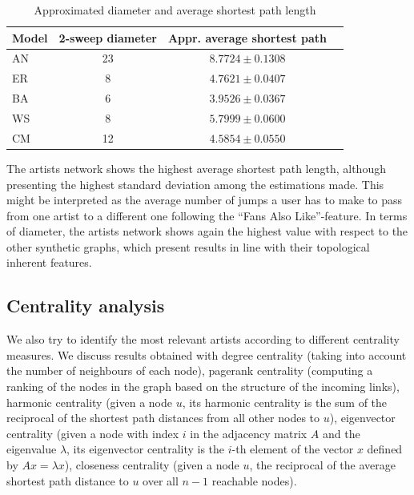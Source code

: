 \documentclass[sigchi]{acmart}
\begin{document}
\renewcommand{\arraystretch}{1.3}
\begin{table}[H]
\begin{center}
\scriptsize
\begin{tabular}{ |l|c|c|c|} 
 \hline
 \textbf{Model} & \textbf{2-sweep diameter} & \textbf{Appr. average shortest path} \\
 \hline
 AN & 23 & $8.7724\pm0.1308$ \\
 ER & $8$ & $4.7621\pm0.0407$\\
 BA &  6 & $3.9526\pm0.0367$ \\
 WS & 8 & $5.7999\pm0.0600$ \\
 CM & 12 & $4.5854\pm0.0550$ \\
 
 \hline
\end{tabular}
\end{center}
\caption{\label{table:diam_short} Approximated diameter and average shortest path length}
\end{table}

The artists network shows the highest average shortest path length, although presenting the highest standard deviation among the estimations made. This might be interpreted as the average number of jumps a user has to make to pass from one artist to a different one following the “Fans Also Like”-feature. In terms of diameter, the artists network shows again the highest value with respect to the other synthetic graphs, which present results in line with their topological inherent features.

\subsection{Centrality analysis}
We also try to identify the most relevant artists according to different centrality measures. We discuss results obtained with degree centrality (taking into account the number of neighbours of each node), pagerank centrality (computing a ranking of the nodes in the graph based on the structure of the incoming links), harmonic centrality (given a node $u$, its harmonic centrality is the sum of the reciprocal of the shortest path distances from all other nodes to $u$), eigenvector centrality (given a node with index $i$ in the adjacency matrix $A$ and the eigenvalue $\lambda$, its eigenvector centrality is the $i$-th element of the vector $x$ defined by $Ax=\lambda x$), closeness centrality (given a node $u$, the reciprocal of the average shortest path distance to $u$ over all $n-1$ reachable nodes).
\end{document}
